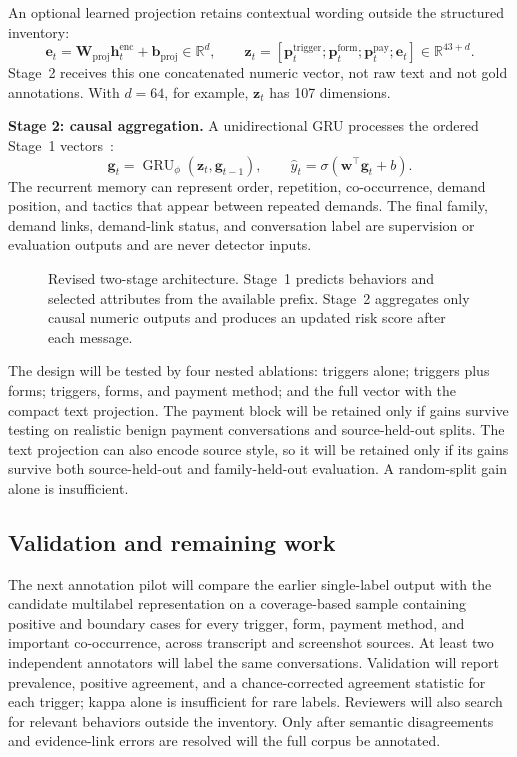 \documentclass[letterpaper,11pt]{article}
\begin{document}
An optional learned projection retains contextual wording outside the structured
inventory:
\begin{equation}
 \mathbf e_t=\mathbf W_{\mathrm{proj}}\mathbf h_t^{\mathrm{enc}}+
 \mathbf b_{\mathrm{proj}}\in\mathbb R^d,
 \qquad
 \mathbf z_t=[\mathbf p_t^{\mathrm{trigger}};
 \mathbf p_t^{\mathrm{form}};\mathbf p_t^{\mathrm{pay}};\mathbf e_t]
 \in\mathbb R^{43+d}.
 \label{eq:stage1-vector}
\end{equation}
Stage~2 receives this one concatenated numeric vector, not raw text and not gold
annotations. With $d=64$, for example, $\mathbf z_t$ has 107 dimensions.

\textbf{Stage 2: causal aggregation.} A unidirectional GRU processes the ordered
Stage~1 vectors~\cite{cho2014gru}:
\begin{equation}
 \mathbf g_t=\operatorname{GRU}_{\phi}(\mathbf z_t,\mathbf g_{t-1}),
 \qquad
 \hat y_t=\sigma(\mathbf w^{\top}\mathbf g_t+b).
 \label{eq:stage2}
\end{equation}
The recurrent memory can represent order, repetition, co-occurrence, demand
position, and tactics that appear between repeated demands. The final family,
demand links, demand-link status, and conversation label are supervision or
evaluation outputs and are never detector inputs.

\begin{figure}[tb]
\centering\resizebox{\linewidth}{!}{}
\caption{Revised two-stage architecture. Stage~1 predicts behaviors and selected
attributes from the available prefix. Stage~2 aggregates only causal numeric
outputs and produces an updated risk score after each message.}
\label{fig:architecture}
\end{figure}

The design will be tested by four nested ablations: triggers alone; triggers plus
forms; triggers, forms, and payment method; and the full vector with the compact
text projection. The payment block will be retained only if gains survive testing
on realistic benign payment conversations and source-held-out splits. The text
projection can also encode source style, so it will be retained only if its gains
survive both source-held-out and family-held-out evaluation. A random-split gain
alone is insufficient.

\subsection{Validation and remaining work}
The next annotation pilot will compare the earlier single-label output with the
candidate multilabel representation on a coverage-based sample containing
positive and boundary cases for every trigger, form, payment method, and important
co-occurrence, across transcript and screenshot sources. At least two independent
annotators will label the same conversations. Validation will report prevalence,
positive agreement, and a chance-corrected agreement statistic for each trigger;
kappa alone is insufficient for rare labels. Reviewers will also search for
relevant behaviors outside the inventory. Only after semantic disagreements and
evidence-link errors are resolved will the full corpus be annotated.
\end{document}
